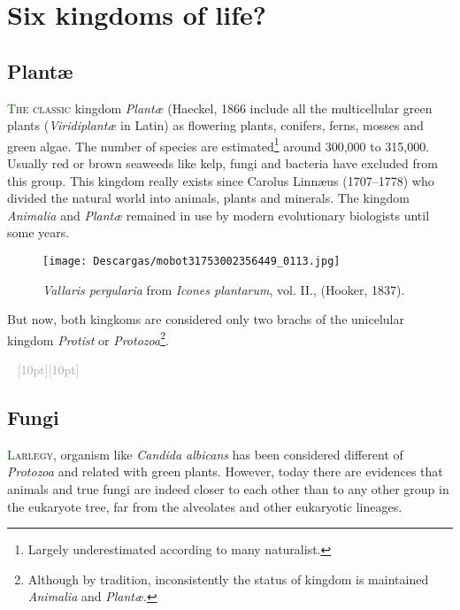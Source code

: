 \documentclass[twoside,12pt,english]{book}
\newcommand*\initfamily{\usefont{U}{Acorn}{xl}{n}}
\newcommand{\ornamento}{\vspace{2em}\noindent \textcolor{darkgray}{\hrulefill~ \raisebox{-2.5pt}[10pt][10pt]{\leafright \decofourleft \decothreeleft  \aldineright \decotwo \floweroneleft \decoone   \floweroneright \decotwo \aldineleft\decothreeright \decofourright \leafleft} ~  \hrulefill \\ \vspace{2em}}}
\begin{document}

\chapter{Six kingdoms of life?}
\newpage

\section{Plant\ae}
\lettrine[lines=3]{\initfamily\textcolor{darkgreen}{T}}{he classic} kingdom \emph{Plant\ae} (Haeckel, 1866
include all the multicellular green plants (\emph{Viridiplant\ae} in Latin) as flowering  
plants, conifers, ferns, mosses and green algae. The number of species 
are estimated\footnote{Largely underestimated according to many naturalist.} around 300,000 to 315,000. 
Usually red or brown seaweeds like kelp, fungi and bacteria have
excluded from this group.
This kingdom really exists since Carolus Linn\ae us (1707--1778) who 
divided the natural world into animals, plants and minerals. The kingdom \emph{Animalia}  and \emph{Plant\ae} remained 
in use by modern evolutionary biologists until some years.  

\begin{wrapfigure}{r}{0.26\textwidth}
\centering
\texttt{[image: Descargas/mobot31753002356449\_0113.jpg]}
\caption{\footnotesize \emph{Vallaris pergularia} from \emph{Icones plantarum}, vol. II., (Hooker, 1837).}
\label{fig1}
\end{wrapfigure}
But now, both kingkoms are considered only two brachs of the unicelular kingdom \emph{Protist} 
or \emph{Protozoa}\footnote{Although by tradition,  inconsistently the status of kingdom 
is maintained \emph{Animalia}  and \emph{Plant\ae}.}.  
\lipsum[2]

\lipsum[3]

\ornamento

\section{Fungi}

\lettrine[lines=3]{\initfamily\textcolor{darkgreen}{L}}{arlegy}, organism like \emph{Candida albicans} has
 been considered different of \emph{Protozoa} and related with green plants. However, today there 
 are evidences that animals and true fungi are indeed closer to each other than to any other group 
 in the eukaryote tree, far from the alveolates and other eukaryotic lineages.  
\end{document}
